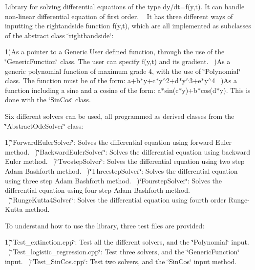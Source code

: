 Library for solving differential equations of the type dy/dt=f(y,t). It can handle non-\/linear differential equation of first order. ~\newline
 It has three different ways of inputting the rightandside function f(y,t), which are all implemented as subclasses of the abstract class \char`\"{}righthandside\char`\"{}\+:

1)As a pointer to a Generic User defined function, through the use of the \char`\"{}\+Generic\+Function\char`\"{} class. The user can specify f(y,t) and its gradient. ~)As a generic polynomial function of maximum grade 4, with the use of \char`\"{}\+Polynomial\char`\"{} class. The function must be of the form\+: a+b$\ast$y+c$\ast$y$^\wedge$2+d$\ast$y$^\wedge$3+e$\ast$y$^\wedge$4 ~)As a function including a sine and a cosine of the form\+: a$\ast$sin(c$\ast$y)+b$\ast$cos(d$\ast$y). This is done with the \char`\"{}\+Sin\+Cos\char`\"{} class. ~\newline


Six different solvers can be used, all programmed as derived classes from the \char`\"{}\+Abstract\+Ode\+Solver\char`\"{} class\+:

1)\char`\"{}\+Forward\+Euler\+Solver\char`\"{}\+: Solves the differential equation using forward Euler method. ~)\char`\"{}\+Backward\+Euler\+Solver\char`\"{}\+: Solves the differential equation using backward Euler method. ~)\char`\"{}\+Twostep\+Solver\char`\"{}\+: Solves the differential equation using two step Adam Bashforth method. ~)\char`\"{}\+Threestep\+Solver\char`\"{}\+: Solves the differential equation using three step Adam Bashforth method. ~)\char`\"{}\+Fourstep\+Solver\char`\"{}\+: Solves the differential equation using four step Adam Bashforth method. ~)\char`\"{}\+Runge\+Kutta4\+Solver\char`\"{}\+: Solves the differential equation using fourth order Runge-\/\+Kutta method. ~\newline


To understand how to use the library, three test files are provided\+:

1)\char`\"{}\+Test\+\_\+extinction.\+cpp\char`\"{}\+: Test all the different solvers, and the \char`\"{}\+Polynomial\char`\"{} input. ~)\char`\"{}\+Test\+\_\+logistic\+\_\+regression.\+cpp\char`\"{}\+: Test three solvers, and the \char`\"{}\+Generic\+Function\char`\"{} input. ~)\char`\"{}\+Test\+\_\+\+Sin\+Cos.\+cpp\char`\"{}\+: Test two solvers, and the \char`\"{}\+Sin\+Cos\char`\"{} input method.

